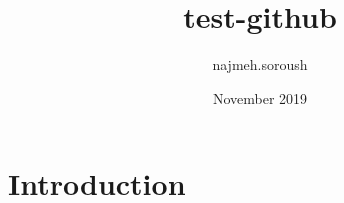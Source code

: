 \documentclass{article}
\title{test-github}
\author{najmeh.soroush }
\date{November 2019}
\begin{document}
\maketitle

\section{Introduction}
\end{document}

